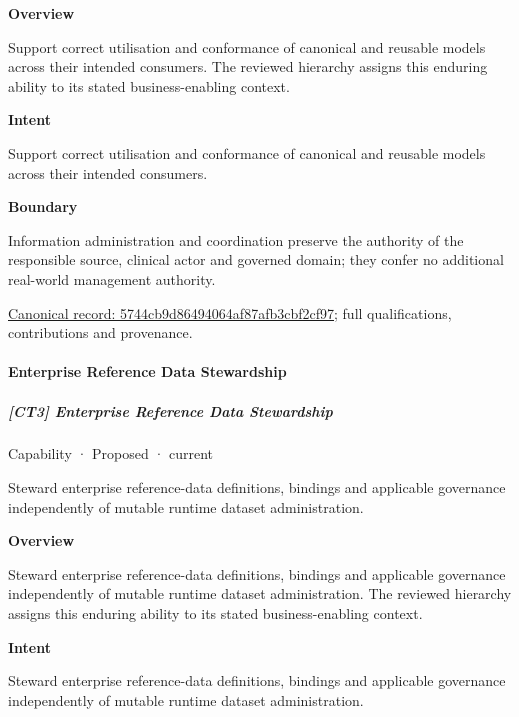 \textbf{Overview}



Support correct utilisation and conformance of canonical and reusable models across their intended consumers. The reviewed hierarchy assigns this enduring ability to its stated business-enabling context.



\textbf{Intent}



Support correct utilisation and conformance of canonical and reusable models across their intended consumers.



\textbf{Boundary}



Information administration and coordination preserve the authority of the responsible source, clinical actor and governed domain; they confer no additional real-world management authority.


{\footnotesize \href{../../../../continuum/strategy/capability/5744cb9d86494064af87afb3cbf2cf97.md}{Canonical record: 5744cb9d86494064af87afb3cbf2cf97}; full qualifications, contributions and provenance.}\par
\paragraph{Enterprise Reference Data Stewardship}

\subparagraph{[CT3] Enterprise Reference Data Stewardship}

\label{element:971d4b079ad24e89b70a8ed8dec0c8bf}
{\small Capability · Proposed · current}\par

Steward enterprise reference-data definitions, bindings and applicable governance independently of mutable runtime dataset administration.



\textbf{Overview}



Steward enterprise reference-data definitions, bindings and applicable governance independently of mutable runtime dataset administration. The reviewed hierarchy assigns this enduring ability to its stated business-enabling context.



\textbf{Intent}



Steward enterprise reference-data definitions, bindings and applicable governance independently of mutable runtime dataset administration.



